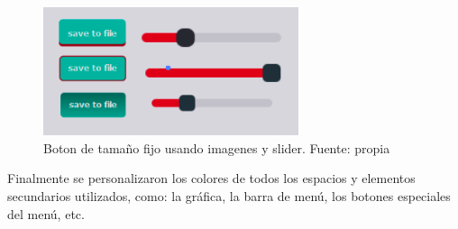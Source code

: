 \begin{figure}[htbp]
	\centerline{\includegraphics[width=7.5cm]{./figuras/qt_button_slide.png}}
	\caption{Boton de tamaño fijo usando imagenes y slider. Fuente: propia}
	\label{fig_20}
\end{figure}

Finalmente se personalizaron los colores de todos los espacios y elementos secundarios utilizados, como: la gráfica, la barra de menú, los botones especiales del menú, etc.


